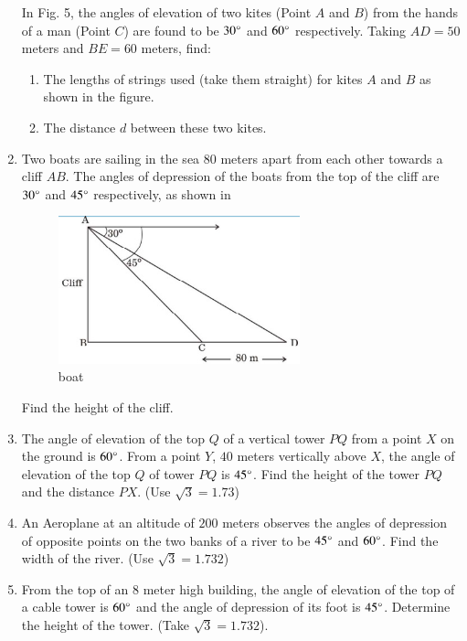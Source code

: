 \begin{enumerate}
    In Fig. 5, the angles of elevation of two kites (Point $A$ and $B$) from the hands of a man (Point $C$) are found to be $30\degree$ and $60\degree$ respectively. Taking $AD = 50$ meters and $BE = 60$ meters, find:
    \begin{enumerate}
        \item The lengths of strings used (take them straight) for kites $A$ and $B$ as shown in the figure.
        \item The distance $d$ between these two kites.
    \end{enumerate}
    
    \hfill{}\item Two boats are sailing in the sea $80$ meters apart from each other towards a cliff $AB$. The angles of depression of the boats from the top of the cliff are $30\degree$ and $45\degree$ respectively, as shown in 
    
    \begin{figure}[H]
        \centering
        \includegraphics[width=70mm]{cbse/figs/boat.edit.jpeg}
        \caption{boat}
        \label{fig:boat.jpeg}
    \end{figure}
    
    Find the height of the cliff.
    
    \hfill{}\item The angle of elevation of the top $Q$ of a vertical tower $PQ$ from a point $X$ on the ground is $60\degree$. From a point $Y$, $40$ meters vertically above $X$, the angle of elevation of the top $Q$ of tower $PQ$ is $45\degree$. Find the height of the tower $PQ$ and the distance $PX$. (Use $\sqrt{3} = 1.73$)
    
    \hfill{}\item An Aeroplane at an altitude of $200$ meters observes the angles of depression of opposite points on the two banks of a river to be $45\degree$ and $60\degree$. Find the width of the river. (Use $\sqrt{3} = 1.732$)
    
    \hfill{}\item From the top of an $8$ meter high building, the angle of elevation of the top of a cable tower is $60\degree$ and the angle of depression of its foot is $45\degree$. Determine the height of the tower. (Take $\sqrt{3} = 1.732$).
    

\end{enumerate}
